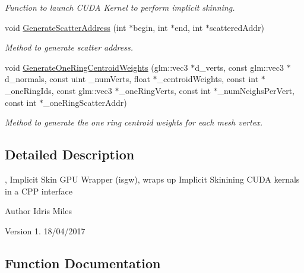\begin{DoxyCompactItemize}
\begin{DoxyCompactList}\small\item\em Function to launch C\+U\+DA Kernel to perform implicit skinning. \end{DoxyCompactList}\item 
void \hyperlink{namespaceisgw_a267fc0628a2245c86afb303701f45ddc}{Generate\+Scatter\+Address} (int $\ast$begin, int $\ast$end, int $\ast$scattered\+Addr)\hypertarget{namespaceisgw_a267fc0628a2245c86afb303701f45ddc}{}\label{namespaceisgw_a267fc0628a2245c86afb303701f45ddc}

\begin{DoxyCompactList}\small\item\em Method to generate scatter address. \end{DoxyCompactList}\item 
void \hyperlink{namespaceisgw_a7040283f07b5b646a4b7a17c1932d930}{Generate\+One\+Ring\+Centroid\+Weights} (glm\+::vec3 $\ast$d\+\_\+verts, const glm\+::vec3 $\ast$d\+\_\+normals, const uint \+\_\+num\+Verts, float $\ast$\+\_\+centroid\+Weights, const int $\ast$\+\_\+one\+Ring\+Ids, const glm\+::vec3 $\ast$\+\_\+one\+Ring\+Verts, const int $\ast$\+\_\+num\+Neighs\+Per\+Vert, const int $\ast$\+\_\+one\+Ring\+Scatter\+Addr)\hypertarget{namespaceisgw_a7040283f07b5b646a4b7a17c1932d930}{}\label{namespaceisgw_a7040283f07b5b646a4b7a17c1932d930}

\begin{DoxyCompactList}\small\item\em Method to generate the one ring centroid weights for each mesh vertex. \end{DoxyCompactList}\end{DoxyCompactItemize}


\subsection{Detailed Description}
, Implicit Skin G\+PU Wrapper (isgw), wraps up Implicit Skinining C\+U\+DA kernals in a C\+PP interface 

\begin{DoxyAuthor}{Author}
Idris Miles 
\end{DoxyAuthor}
\begin{DoxyVersion}{Version}
1.  18/04/2017 
\end{DoxyVersion}


\subsection{Function Documentation}
